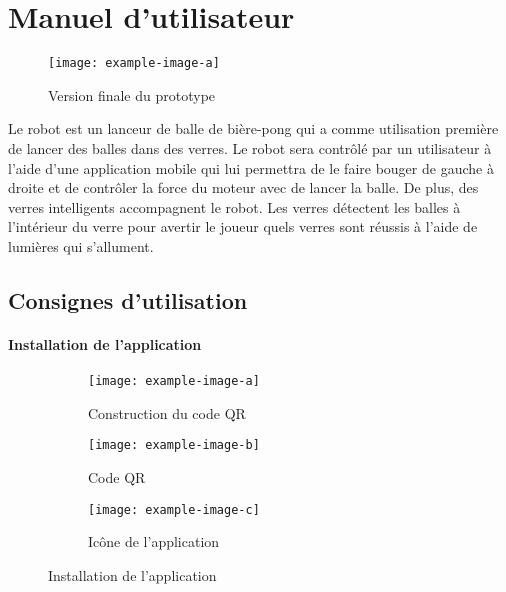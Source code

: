 \section{Manuel d’utilisateur}



\begin{wrapfigure}{r}{0.25\linewidth}
    \centering
    \texttt{[image: example-image-a]}
    \caption{Version finale du prototype}
    \label{fig:a1-protoype}
\end{wrapfigure}

Le robot est un lanceur de balle de bière-pong qui a comme utilisation première de lancer des balles dans des verres.
Le robot sera contrôlé par un utilisateur à l’aide d’une application mobile qui lui permettra de le faire bouger de gauche à droite et de contrôler la force du moteur avec de lancer la balle.
De plus, des verres intelligents accompagnent le robot.
Les verres détectent les balles à l’intérieur du verre pour avertir le joueur quels verres sont réussis à l’aide de lumières qui s’allument.

\subsection{Consignes d'utilisation}

\paragraph{Installation de l’application}

\begin{wrapfigure}{r}{0.5\linewidth}
    \centering

    \begin{subfigure}{0.8\linewidth}
        \centering
        \texttt{[image: example-image-a]}
        \caption{Construction du code QR}
        \label{fig:a1-create-code-QR}
    \end{subfigure}
    \begin{subfigure}{0.4\linewidth}
        \centering
        \texttt{[image: example-image-b]}
        \caption{Code QR}
        \label{fig:a1-code-QR}
    \end{subfigure}
    \begin{subfigure}{0.4\linewidth}
        \centering
        \texttt{[image: example-image-c]}
        \caption{Icône de l’application}
        \label{fig:a1-app-icon}
    \end{subfigure}

    \caption{Installation de l’application}
    \label{fig:template-example-flottante}
\end{wrapfigure}

